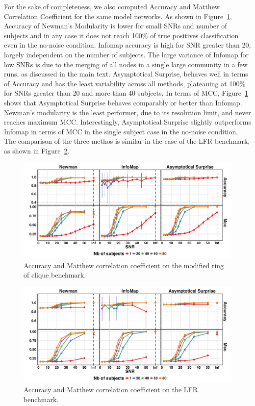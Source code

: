 For the sake of completeness, we also computed Accuracy and Matthew Correlation Coefficient for the same model networks.
As shown in Figure~\ref{fig:accmcc_cliques}, Accuracy of Newman's Modularity is lower for small SNRs and number of subjects and in any case it does not reach 100\% of true positives classification even in the no-noise condition. Infomap accuracy is high for SNR greater than 20, largely independent on the number of subjects. The large variance of Infomap for low SNRs is due to the merging of all nodes in a single large community in a few runs, as discussed in the main text. Asymptotical Surprise, behaves well in terms of Accuracy and has the least variability across all methods, plateauing at 100\% for SNRs greater than 20 and more than 40 subjects.
In terms of MCC, Figure~\ref{fig:accmcc_cliques} shows that Asymptotical Surprise behaves comparably or better than Infomap.
Newman's modularity is the least performer, due to its resolution limit, and never reaches maximum MCC. Interestingly, Asymptotical Surprise slightly outperforms Infomap in terms of MCC in the single subject case in the no-noise condition.
The comparison of the three methos is similar in the case of the LFR benchmark, as shown in Figure~\ref{fig:accmcclfr}.
\begin{figure}[!htb]
\centering
\includegraphics[width=\textwidth]{images/figure3_supplementary.pdf}
\caption{Accuracy and Matthew correlation coefficient on the modified ring of clique benchmark.}
\label{fig:accmcc_cliques}
\end{figure}
\begin{figure}[!htb]
\centering
\includegraphics[width=\textwidth]{images/figure4_supplementary.pdf}
\caption{Accuracy and Matthew correlation coefficient on the LFR benchmark.}
\label{fig:accmcclfr}
\end{figure}

